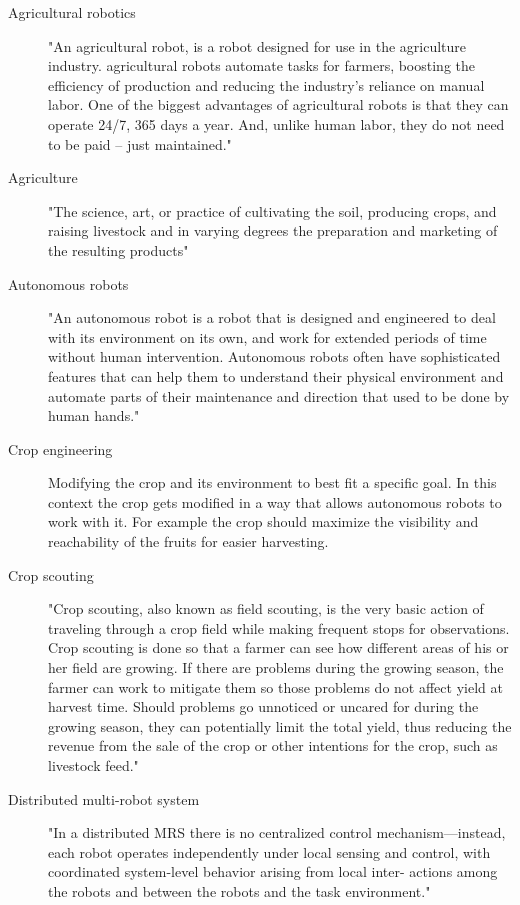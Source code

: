     \begin{description}
        \item[Agricultural robotics] "An agricultural robot, is a robot designed for use in the agriculture industry. agricultural robots automate tasks for farmers, boosting the efficiency of production and reducing the industry’s reliance on manual labor. One of the biggest advantages of agricultural robots is that they can operate 24/7, 365 days a year. And, unlike human labor, they do not need to be paid – just maintained." \cite{MarketBusinessNews2020} 
        \item[Agriculture] "The science, art, or practice of cultivating the soil, producing crops, and raising livestock and in varying degrees the preparation and marketing of the resulting products" \cite{MerriamWebster2020}
        \item[Autonomous robots] "An autonomous robot is a robot that is designed and engineered to deal with its environment on its own, and work for extended periods of time without human intervention. Autonomous robots often have sophisticated features that can help them to understand their physical environment and automate parts of their maintenance and direction that used to be done by human hands." \cite{Technopedia2020}    
        \item[Crop engineering]  Modifying the crop and its environment to best fit a specific goal. In this context the crop gets modified in a way that allows autonomous robots to work with it. For example the crop should maximize the visibility and reachability of the fruits for easier harvesting.
        \item[Crop scouting]  "Crop scouting, also known as field scouting, is the very basic action of traveling through a crop field while making frequent stops for observations. Crop scouting is done so that a farmer can see how different areas of his or her field are growing. If there are problems during the growing season, the farmer can work to mitigate them so those problems do not affect yield at harvest time. Should problems go unnoticed or uncared for during the growing season, they can potentially limit the total yield, thus reducing the revenue from the sale of the crop or other intentions for the crop, such as livestock feed." \cite{Farms2020}
        \item[Distributed multi-robot system] "In a distributed MRS there is no centralized control mechanism—instead, each robot operates independently under local sensing and control, with coordinated system-level behavior arising from local inter- actions among the robots and between the robots and the task environment." \cite{Lerman2006}

\end{description}
